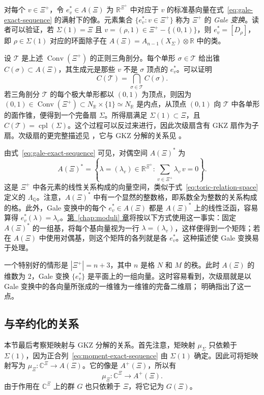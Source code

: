 对每个 $v\in\Xi^+$，令 $e_v^*\in A(\Xi)$ 为 $\mathbb R^{\Xi^+}$ 中对应于 $v$ 的标准基向量在式~\eqref{eq:gale-exact-sequence} 的满射下的像。元素集合 $\{e_v^*:v\in\Xi^+\}$ 称为 $\Xi^+$ 的 \emph{Gale 变换}。读者可以验证，若 $\Sigma(1)=\Xi$ 且 $v=(\rho,1)\in\Xi^+-\{(0,1)\}$，则 $e_v^*=[D_\rho]$，即 $\rho\in\Sigma(1)$ 对应的环面除子在 $A(\Xi)=A_{n-1}(X_\Sigma)\otimes\mathbb R$ 中的类。

设 $\mathcal T$ 是上述 $\operatorname{Conv}(\Xi^+)$ 的正则三角剖分。每个单形 $\sigma\in\mathcal T$ 给出锥 $C(\sigma)\subset A(\Xi)$，其生成元是那些 $v$ 不是 $\sigma$ 顶点的 $e_v^*$。可以证明
\[
C(\mathcal T)=\bigcap_{\sigma\in\mathcal T}C(\sigma).
\]
若三角剖分 $\mathcal T$ 的每个极大单形都以 $(0,1)$ 为顶点，则因为 $(0,1)\in\operatorname{Conv}(\Xi^+)\subset N_{\mathbb R}\times\{1\}\simeq N_{\mathbb R}$ 是内点，从顶点 $(0,1)$ 向 $\mathcal T$ 中各单形的面作锥，便得到一个完备扇 $\Sigma$。所得扇满足 $\Sigma(1)\subset\Xi$，且 $C(\mathcal T)=\operatorname{cpl}(\Sigma)$。这个过程可以反过来进行，因此次级扇含有 GKZ 扇作为子扇。次级扇的更完整描述见 ，它与 GKZ 分解的关系见 。

由式~\eqref{eq:gale-exact-sequence} 可见，对偶空间 $A(\Xi)^*$ 为
\[
A(\Xi)^*=
\left\{\lambda=(\lambda_v)\in\mathbb R^{\Xi^+}:
\sum_{v\in\Xi^+}\lambda_v\,v=0\right\}.
\]
这是 $\Xi^+$ 中各元素的线性关系构成的向量空间，类似于式~\eqref{eq:toric-relation-space} 定义的 $\Lambda_{\mathbb Q}$。注意，$A(\Xi)^*$ 中有一个显然的整数格，即系数全为整数的关系构成的格。此外，Gale 变换中的每个 $e_v^*\in A(\Xi)$ 都是 $A(\Xi)^*$ 上的线性泛函，容易算得 $e_v^*(\lambda)=\lambda_v$。\hyperref[chap:moduli]{第~\ref*{chap:moduli} 章}将按以下方式使用这一事实：固定 $A(\Xi)^*$ 的一组基，将每个基向量视为一行 $\lambda=(\lambda_v)$，这样便得到一个矩阵；若在 $A(\Xi)$ 中使用对偶基，则这个矩阵的各列就是各 $e_v^*$。这种描述使 Gale 变换易于处理。

一个特别好的情形是 $|\Xi^+|=n+3$，其中 $n$ 是格 $N$ 和 $M$ 的秩。此时 $A(\Xi)$ 的维数为 $2$，Gale 变换 $\{e_v^*\}$ 是平面上的一组向量。这时容易看到，次级扇就是以 Gale 变换中的各向量所张成的一维锥为一维锥的完备二维扇； 明确指出了这一点。

\subsection{与辛约化的关系}\label{subsec:gkz-reduction}

本节最后考察矩映射与 GKZ 分解的关系。首先注意，矩映射 $\mu_\Sigma$ 只依赖于 $\Sigma(1)$，因为正合列~\eqref{eq:moment-exact-sequence} 由 $\Sigma(1)$ 确定。因此可将矩映射写为 $\mu_\Xi:\mathbb C^\Xi\to A(\Xi)$。它的像是 $A^+(\Xi)$，所以有
\[
\mu_\Xi:\mathbb C^\Xi\longrightarrow A^+(\Xi).
\]
由于作用在 $\mathbb C^\Xi$ 上的群 $G$ 也只依赖于 $\Xi$，将它记为 $G(\Xi)$。

